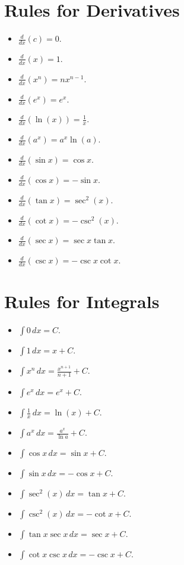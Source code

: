 \documentclass[addpoints, 12pt]{exam}%
\theoremstyle{definition}
\begin{document}
\newpage 



\newpage

\section{Rules for Derivatives}
\begin{multicols}{2}
\begin{itemize}
  \item $\displaystyle\frac{d}{dx} (c) = 0$.
  \item $\displaystyle\frac{d}{dx} (x) = 1$.
  \item $\displaystyle\frac{d}{dx} (x^n) = n x^{n - 1}$.
  \item $\displaystyle\frac{d}{dx} (e^x ) = e^x$.
  \item $\displaystyle\frac{d}{dx} (\ln (x)) = \frac{1}{x}$.
  \item $\displaystyle\frac{d}{dx} (a^x) = a^x \ln (a)$. 
  \item $\displaystyle\frac{d}{dx} (\sin x) = \cos x$. 
  \item $\displaystyle\frac{d}{dx} (\cos x) = -\sin x$.
  \item $\displaystyle\frac{d}{dx} (\tan x) = \sec^2 (x)$.
  \item $\displaystyle\frac{d}{dx} (\cot x) = -\csc^2 (x)$.
  \item $\displaystyle\frac{d}{dx} (\sec x ) = \sec x \tan x$.
  \item $\displaystyle\frac{d}{dx} (\csc x) = -\csc x \cot x$.
\end{itemize}
\end{multicols}

\section{Rules for Integrals}
\begin{multicols}{2}
\begin{itemize}
\item $\displaystyle\int 0 \, dx = C$.
\item $\displaystyle\int 1 \, dx = x + C$.
\item $\displaystyle\int x^n \, dx = \frac{x^{n + 1}}{n + 1} + C$.
\item $\displaystyle\int e^x \, dx = e^x + C$.
\item $\displaystyle\int \frac{1}{x} \, dx = \ln (x) + C$.
\item $\displaystyle\int a^x \, dx = \frac{a^x}{\ln a} + C$.
\item $\displaystyle\int \cos x \, dx = \sin x + C$. 
\item $\displaystyle\int \sin x \, dx = -\cos x + C$.
\item $\displaystyle\int \sec^2 (x) \, dx = \tan x + C$.
\item $\displaystyle\int \csc^2 (x) \, dx = - \cot x + C$.
\item $\displaystyle\int \tan x \sec x \, dx = \sec x + C$.
\item $\displaystyle\int \cot x \csc x \, dx = -\csc x + C$.
\end{itemize}
\end{multicols}
\end{document}
